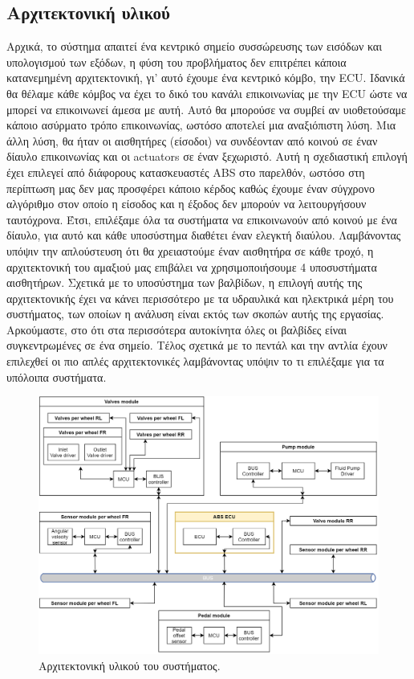 \documentclass{article}
\begin{document}
\subsection{Αρχιτεκτονική υλικού}
Αρχικά, το σύστημα απαιτεί ένα κεντρικό σημείο συσσώρευσης των εισόδων και υπολογισμού των εξόδων, η φύση του προβλήματος δεν επιτρέπει κάποια κατανεμημένη αρχιτεκτονική, γι' αυτό έχουμε ένα κεντρικό κόμβο, την ECU. Ιδανικά θα θέλαμε κάθε κόμβος να έχει το δικό του κανάλι επικοινωνίας με την ECU ώστε να μπορεί να επικοινωνεί άμεσα με αυτή. Αυτό θα μπορούσε να συμβεί αν υιοθετούσαμε κάποιο ασύρματο τρόπο επικοινωνίας, ωστόσο αποτελεί μια αναξιόπιστη λύση. Μια άλλη λύση, θα ήταν οι αισθητήρες (είσοδοι) να συνδέονταν από κοινού σε έναν δίαυλο επικοινωνίας και οι actuators σε έναν ξεχωριστό. Αυτή η σχεδιαστική επιλογή έχει επιλεγεί από διάφορους κατασκευαστές ABS στο παρελθόν, ωστόσο στη περίπτωση μας δεν μας προσφέρει κάποιο κέρδος καθώς έχουμε έναν σύγχρονο αλγόριθμο στον οποίο η είσοδος και η έξοδος δεν μπορούν να λειτουργήσουν ταυτόχρονα. Έτσι, επιλέξαμε όλα τα συστήματα να επικοινωνούν από κοινού με ένα δίαυλο, για αυτό και κάθε υποσύστημα διαθέτει έναν ελεγκτή διαύλου. Λαμβάνοντας υπόψιν την απλούστευση ότι θα χρειαστούμε έναν αισθητήρα σε κάθε τροχό, η αρχιτεκτονική του αμαξιού μας επιβάλει να χρησιμοποιήσουμε 4 υποσυστήματα αισθητήρων. Σχετικά με το υποσύστημα των βαλβίδων, η επιλογή αυτής της αρχιτεκτονικής έχει να κάνει περισσότερο με τα υδραυλικά και ηλεκτρικά μέρη του συστήματος, των οποίων η ανάλυση είναι εκτός των σκοπών αυτής της εργασίας. Αρκούμαστε, στο ότι στα περισσότερα αυτοκίνητα όλες οι βαλβίδες είναι συγκεντρωμένες σε ένα σημείο. Τέλος σχετικά με το πεντάλ και την αντλία έχουν επιλεχθεί οι πιο απλές αρχιτεκτονικές λαμβάνοντας υπόψιν το τι επιλέξαμε για τα υπόλοιπα συστήματα. 

\begin{figure}[h]
    \begin{center}
    \includegraphics[scale=0.2]{images/hardware-architecture.png}
    \end{center}
    \caption{Αρχιτεκτονική υλικού του συστήματος.}
    \label{fig:hardware-architecture}
\end{figure}
\end{document}
